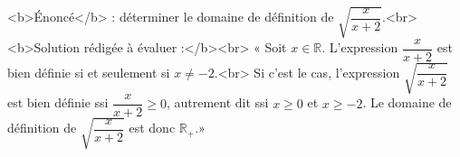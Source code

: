 <b>Énoncé</b> : déterminer le domaine de définition de $\sqrt{\dfrac{x}{x+2}}$.<br> <b>Solution rédigée à évaluer :</b><br>  « Soit $x\in\mathbb{R}$. L'expression $\dfrac{x}{x+2}$ est bien définie si et seulement si $x\neq -2$.<br> Si c'est le cas, l'expression $\sqrt{\dfrac{x}{x+2}}$ est bien définie ssi $\dfrac{x}{x+2}\geq 0$, autrement dit ssi $x\geq 0$ et $x\geq -2$. Le domaine de définition de $\sqrt{\dfrac{x}{x+2}}$ est donc $\mathbb{R}_{+}$.»

\begin{reponses}
\end{reponses}

\begin{comment}
Si le numérateur et le dénominateur sont négatifs, alors le quotient est positif.
\end{comment}

